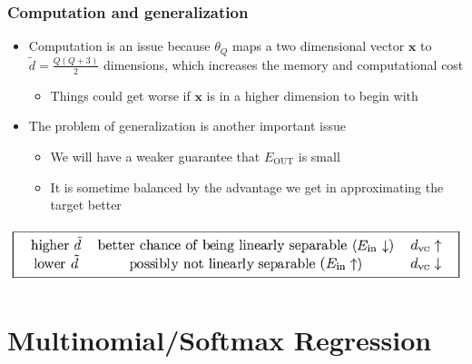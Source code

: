 \documentclass[11pt]{article}
\begin{document}
\subsubsection{Computation and generalization}
\label{sec:orgdf85d3d}
\begin{itemize}
\item Computation is an issue because \(\theta_Q\) maps a two dimensional vector \(\pmb x\) to \(\tilde d = \frac{Q(Q+3)}2\) dimensions, which increases the memory and computational cost
\begin{itemize}
\item Things could get worse if \(\pmb x\) is in a higher dimension to begin with
\end{itemize}

\item The problem of generalization is another important issue
\begin{itemize}
\item We will have a weaker guarantee that \(E_\text{OUT}\) is small
\item It is sometime balanced  by the advantage we get in approximating the target better
\end{itemize}
\end{itemize}

\begin{center}
\includegraphics[width=.9\linewidth]{The Linear Model (3)/screenshot_2018-09-04_07-51-06.png}
\end{center}
\section{Multinomial/Softmax Regression}
\label{sec:org3ca051c}
\end{document}
